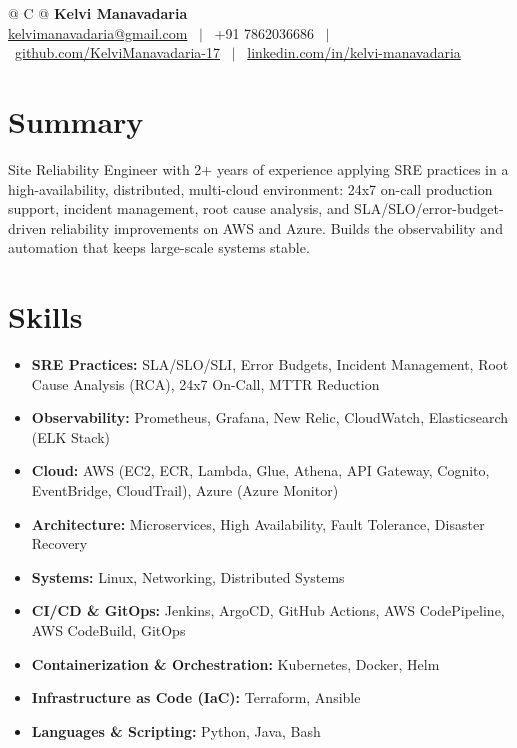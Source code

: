 \documentclass[a4paper,10.999999pt]{article}
\begin{document}
    \pagestyle{empty}



    \begin{tabularx}{\linewidth}{@{} C @{}}
    \LARGE{\textbf{Kelvi Manavadaria}} \\[4pt]
    \href{mailto:kelvimanavadaria@gmail.com}{kelvimanavadaria@gmail.com} \ $|$ \
    +91 7862036686 \ $|$ \
    \href{https://github.com/KelviManavadaria-17}{github.com/KelviManavadaria-17} \ $|$ \
    \href{https://www.linkedin.com/in/kelvi-manavadaria/}{linkedin.com/in/kelvi-manavadaria}
    \end{tabularx}


    \section{Summary}
Site Reliability Engineer with 2+ years of experience applying SRE practices in a high-availability, distributed, multi-cloud environment: 24x7 on-call production support, incident management, root cause analysis, and SLA/SLO/error-budget-driven reliability improvements on AWS and Azure. Builds the observability and automation that keeps large-scale systems stable.


    \section{Skills}
    \begin{itemize}[leftmargin=1.5em, itemsep=2pt, label=\raisebox{0.25ex}{\tiny$\circ$}]
    \item \textbf{SRE Practices:} SLA/SLO/SLI, Error Budgets, Incident Management, Root Cause Analysis (RCA), 24x7 On-Call, MTTR Reduction
    \item \textbf{Observability:} Prometheus, Grafana, New Relic, CloudWatch, Elasticsearch (ELK Stack)
    \item \textbf{Cloud:} AWS (EC2, ECR, Lambda, Glue, Athena, API Gateway, Cognito, EventBridge, CloudTrail), Azure (Azure Monitor)
    \item \textbf{Architecture:} Microservices, High Availability, Fault Tolerance, Disaster Recovery
    \item \textbf{Systems:} Linux, Networking, Distributed Systems
    \item \textbf{CI/CD \& GitOps:} Jenkins, ArgoCD, GitHub Actions, AWS CodePipeline, AWS CodeBuild, GitOps
    \item \textbf{Containerization \& Orchestration:} Kubernetes, Docker, Helm
    \item \textbf{Infrastructure as Code (IaC):} Terraform, Ansible
    \item \textbf{Languages \& Scripting:} Python, Java, Bash
    \end{itemize}
\end{document}
